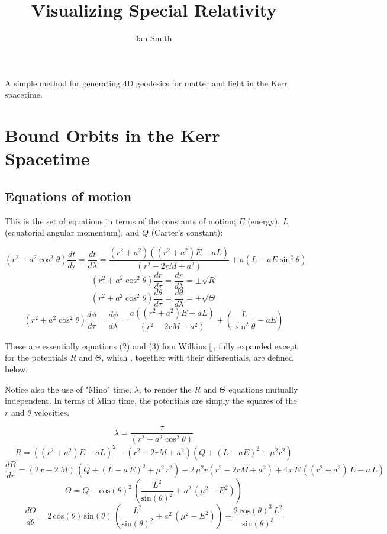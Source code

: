\documentclass[11pt]{article}
\title{\textbf{Visualizing Special Relativity}}
\author{Ian Smith}
\date{}
\begin{document}
\maketitle

\abstract
A simple method for generating 4D geodesics for matter and light in the Kerr spacetime.

\section{Bound Orbits in the Kerr Spacetime}

\subsection {Equations of motion}

This is the set of equations in terms of the constants of motion; $E$ (energy), $L$ (equatorial angular momentum), and $Q$ (Carter's constant):

$$
(r^2 + a^2 \cos^2\theta) \frac{d t}{d \tau} = \frac{d t}{d \lambda} = \frac{(r^2 + a^2) ((r^2 + a^2) E - aL)} {({r}^{2} - 2rM  + {a}^{2})} + a(L - aE \sin^2 \theta)
$$
$$
(r^2 + a^2 \cos^2\theta) \frac{d r}{d \tau} = \frac{d r}{d \lambda} = \pm \sqrt R
$$
$$
(r^2 + a^2 \cos^2\theta) \frac{d \theta}{d \tau} = \frac{d \theta}{d \lambda} = \pm \sqrt \Theta
$$
$$
(r^2 + a^2 \cos^2\theta) \frac{d \phi}{d \tau}= \frac{d \phi}{d \lambda} = \frac{a ((r^2 + a^2) E - aL)} {({r}^{2} - 2rM  + {a}^{2})} + (\frac {L} {\sin^2 \theta} -aE)
$$

These are essentially equations (2) and (3) fom Wilkins [], fully expanded except for the potentials $R$ and $\Theta$, which , together with their differentials, are defined below.

Notice also the use of "Mino" time, $\lambda$, to render the $R$ and $\Theta$ equations mutually independent.  In terms of Mino time, the potentials are simply the squares of the $r$ and $\theta$ velocities.

$$
\lambda = \frac {\tau} {(r^2 + a^2 \cos^2\theta)}
$$
$$
R = ((r^2 + a^2) E - aL)^2 - (r^2 - 2rM  + a^{2}) ( Q+{\left( L - aE\right) }^{2}+{\mu}^{2}{r}^{2})
$$
$$
\frac{d R}{d r} = \left( 2\,r - 2\,M\right) \,\left( Q+{\left( L - a\,E\right) }^{2}+{\mu}^{2}\,{r}^{2}\right) - 2\,{\mu}^{2}r({r}^{2} - 2rM  + {a}^{2}) +4\,r\,E\,\left( \left( {r}^{2}+{a}^{2}\right) \,E - a\,L\right)
$$
$$
\Theta=Q - {\mathrm{cos}\left( \theta\right) }^{2}\,\left( \frac{{L}^{2}}{{\mathrm{sin}\left( \theta\right) }^{2}}+{a}^{2}\,\left( {\mu}^{2} - {E}^{2}\right) \right)
$$
$$
\frac{d \Theta}{d \theta} = 2\,\mathrm{cos}\left( \theta\right) \,\mathrm{sin}\left( \theta\right) \,\left( \frac{{L}^{2}}{{\mathrm{sin}\left( \theta\right) }^{2}}+{a}^{2}\,\left( {\mu}^{2} - {E}^{2}\right) \right) +\frac{2\,{\mathrm{cos}\left( \theta\right) }^{3}\,{L}^{2}}{{\mathrm{sin}\left( \theta\right) }^{3}}
$$
\end{document}

